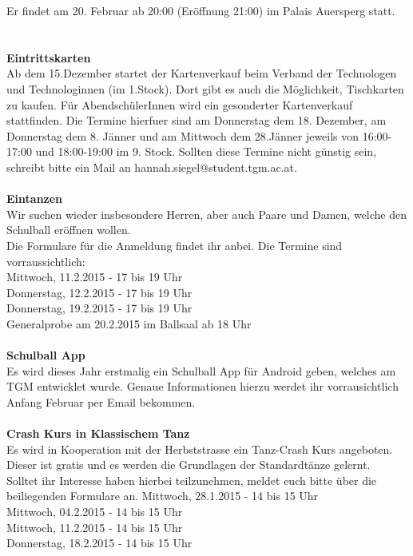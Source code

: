 \documentclass[12pt]{article}
\begin{document}
Er findet am 20. Februar ab 20:00 (Eröffnung 21:00) im Palais Auersperg statt.\\
\\ \\
\textbf{Eintrittskarten} \\
Ab dem 15.Dezember startet der Kartenverkauf beim Verband der Technologen und Technologinnen (im 1.Stock). Dort gibt es auch die Möglichkeit, Tischkarten zu kaufen. Für AbendschülerInnen wird ein gesonderter Kartenverkauf stattfinden. Die Termine hierfuer sind am Donnerstag dem 18. Dezember, am Donnerstag dem 8. Jänner und am Mittwoch dem 28.Jänner jeweils von 16:00-17:00 und 18:00-19:00 im 9. Stock. Sollten diese Termine nicht günstig sein, schreibt bitte ein Mail an hannah.siegel@student.tgm.ac.at.
\\ \\
\textbf{Eintanzen} \\
Wir suchen wieder insbesondere Herren, aber auch Paare und Damen, welche den Schulball eröffnen wollen. \\
Die Formulare für die Anmeldung findet ihr anbei. Die Termine sind vorraussichtlich: \\
Mittwoch, 11.2.2015 - 17 bis 19 Uhr \\ 
Donnerstag, 12.2.2015 - 17 bis 19 Uhr \\
Donnerstag, 19.2.2015 - 17 bis 19 Uhr \\
Generalprobe am 20.2.2015 im Ballsaal ab 18 Uhr \\ \\
\textbf{Schulball App} \\
Es wird dieses Jahr erstmalig ein Schulball App für Android geben, welches am TGM entwicklet wurde. Genaue Informationen hierzu werdet ihr vorrausichtlich Anfang Februar per Email bekommen.
\\ \\
\textbf{Crash Kurs in Klassischem Tanz} \\
Es wird in Kooperation mit der Herbststrasse ein Tanz-Crash Kurs angeboten. Dieser ist gratis und es werden die Grundlagen der Standardtänze gelernt. \\
Solltet ihr Interesse haben hierbei teilzunehmen, meldet euch bitte über die beiliegenden Formulare an. Mittwoch, 28.1.2015 - 14 bis 15 Uhr \\ 
Mittwoch, 04.2.2015 - 14 bis 15 Uhr \\ 
Mittwoch, 11.2.2015 - 14 bis 15 Uhr \\
Donnerstag, 18.2.2015 - 14 bis 15 Uhr 
\\ \\
\end{document}
